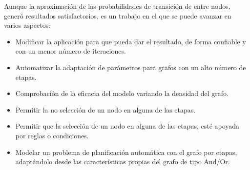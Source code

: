 Aunque la aproximación de las probabilidades de transición de entre nodos, generó resultados satisfactorios, es un trabajo en el que se puede avanzar en varios aspectos:
\begin{itemize}
    \item Modificar la aplicación para que pueda dar el resultado, de forma confiable y con un menor número de iteraciones.    
    \item Automatizar la adaptación de parámetros para grafos con un alto número de etapas.  \item Comprobación de la eficacia del modelo variando la densidad del grafo.    
    \item Permitir la no selección de un nodo en alguna de las etapas.
    \item Permitir que la selección de un nodo en alguna de las etapas, esté apoyada por reglas o condiciones.    
    \item Modelar un problema de planificación automática con el grafo por etapas, adaptándolo desde las características propias del grafo de tipo And/Or.   
\end{itemize} 

